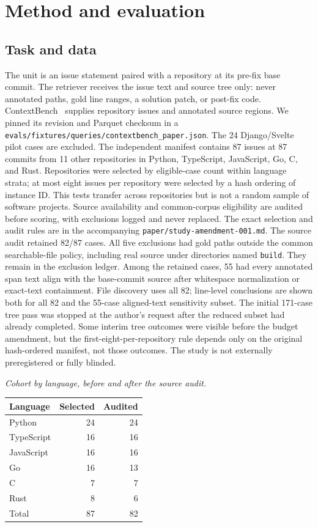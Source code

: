 \documentclass[
]{article}
\newcounter{none} %
\begin{document}
\section{Method and evaluation}\label{method-and-evaluation}

\subsection{Task and data}\label{task-and-data}

The unit is an issue statement paired with a repository at its pre-fix
base commit. The retriever receives the issue text and source tree only:
never annotated paths, gold line ranges, a solution patch, or post-fix
code. ContextBench~\cite{li2026contextbench} supplies
repository issues and annotated source regions. We pinned its revision
and Parquet checksum in a
\texttt{evals/fixtures/queries/contextbench\_paper.json}.
The 24 Django/Svelte pilot cases are excluded. The independent manifest
contains 87 issues at 87 commits from 11 other repositories in Python,
TypeScript, JavaScript, Go, C, and Rust. Repositories were selected by
eligible-case count within language strata; at most eight issues per
repository were selected by a hash ordering of instance ID. This tests
transfer across repositories but is not a random sample of software
projects. Source availability and common-corpus eligibility are audited
before scoring, with exclusions logged and never replaced. The exact
selection and audit rules are in the accompanying
\texttt{paper/study-amendment-001.md}. The source audit retained 82/87 cases. All five
exclusions had gold paths outside the common searchable-file policy,
including real source under directories named \texttt{build}. They
remain in the exclusion ledger. Among the retained cases, 55 had every
annotated span text align with the base-commit source after whitespace
normalization or exact-text containment. File discovery uses all 82;
line-level conclusions are shown both for all 82 and the 55-case
aligned-text sensitivity subset. The initial 171-case tree pass was
stopped at the author's request after the reduced subset had already
completed. Some interim tree outcomes were visible before the budget
amendment, but the first-eight-per-repository rule depends only on the
original hash-ordered manifest, not those outcomes. The study is not
externally preregistered or fully blinded.

\noindent\textit{Cohort by language, before and after the source audit.}
{\def\LTcaptype{none} %
\begin{longtable}[]{@{}lrr@{}}
\toprule\noalign{}
Language & Selected & Audited \\
\midrule\noalign{}
\endhead
\bottomrule\noalign{}
\endlastfoot
Python & 24 & 24 \\
TypeScript & 16 & 16 \\
JavaScript & 16 & 16 \\
Go & 16 & 13 \\
C & 7 & 7 \\
Rust & 8 & 6 \\
Total & 87 & 82 \\
\end{longtable}
}
\end{document}
